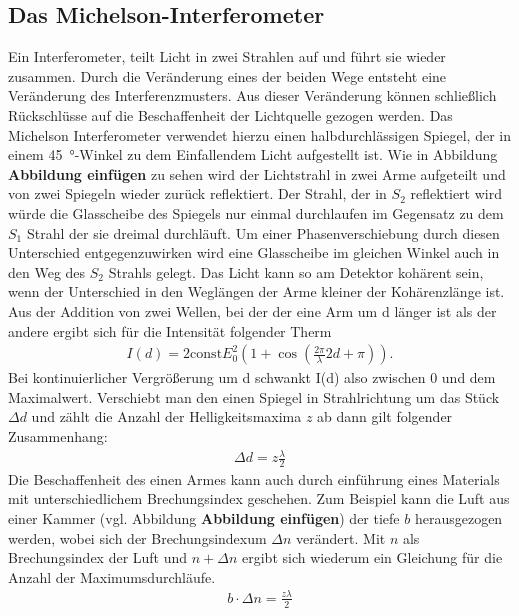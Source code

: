 \subsection{Das Michelson-Interferometer}
Ein Interferometer, teilt Licht in zwei Strahlen auf und führt sie wieder zusammen.
Durch die Veränderung eines der beiden Wege entsteht eine Veränderung des Interferenzmusters.
Aus dieser Veränderung können schließlich Rückschlüsse auf die Beschaffenheit der Lichtquelle gezogen werden.
Das Michelson Interferometer verwendet hierzu einen halbdurchlässigen Spiegel, der in einem \qty{45}{\degree}-Winkel 
zu dem Einfallendem Licht aufgestellt ist. 
Wie in Abbildung \textbf{Abbildung einfügen} zu sehen wird der Lichtstrahl in zwei Arme aufgeteilt und von zwei Spiegeln wieder zurück reflektiert.
Der Strahl, der in $S_2$ reflektiert wird würde die Glasscheibe des Spiegels nur einmal durchlaufen im Gegensatz zu dem $S_1$ Strahl
der sie dreimal durchläuft.
Um einer Phasenverschiebung durch diesen Unterschied entgegenzuwirken wird eine Glasscheibe im gleichen Winkel 
auch in den Weg des $S_2$ Strahls gelegt.
Das Licht kann so am Detektor kohärent sein, wenn der Unterschied in den Weglängen der Arme kleiner der Kohärenzlänge ist.
Aus der Addition von zwei Wellen, bei der der eine Arm um d länger ist als der andere ergibt sich für die Intensität folgender Therm
\begin{align}
    I(d) = 2 \text{const} E_0^2 \left(1+ \cos\left(\frac{2\pi}{\lambda} 2d + \pi\right)\right).
\end{align}
Bei kontinuierlicher Vergrößerung um d schwankt I(d) also zwischen 0 und dem Maximalwert.
Verschiebt man den einen Spiegel in Strahlrichtung um das Stück $\Delta d$ und zählt die Anzahl der Helligkeitsmaxima $z$ ab
dann gilt folgender Zusammenhang:
\begin{align}
    \Delta d = z \frac{\lambda}{2}
    \label{eq:d_mod}
\end{align} 
Die Beschaffenheit des einen Armes kann auch durch einführung eines Materials mit unterschiedlichem Brechungsindex 
geschehen.
Zum Beispiel kann die Luft aus einer Kammer (vgl. Abbildung \textbf{Abbildung einfügen}) der tiefe $b$ herausgezogen werden,
wobei sich der Brechungsindexum $\Delta n$ verändert.
Mit $n$ als Brechungsindex der Luft und $n + \Delta n$ ergibt sich wiederum ein Gleichung für die Anzahl der Maximumsdurchläufe.
\begin{align}
    b \cdot \Delta n = \frac{z \lambda}{2}
    \label{eq:n_mod}
\end{align}

